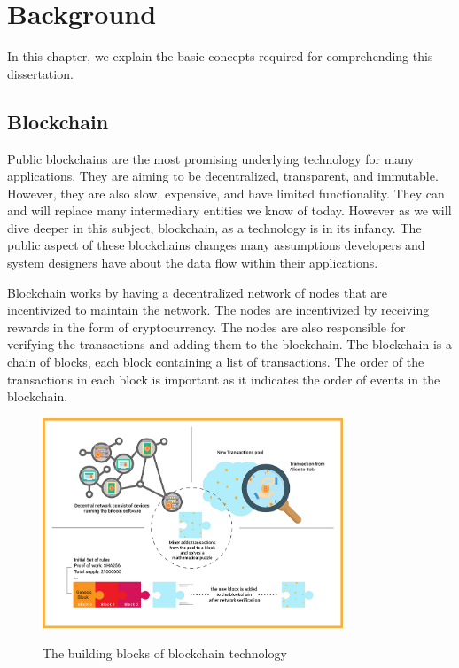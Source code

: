 


\chapter{Background} \label{sec:background}


In this chapter, we explain the basic concepts required for comprehending this dissertation.



\section{Blockchain}
Public blockchains are the most promising underlying technology for many applications. They are aiming to be decentralized, transparent, and immutable. However, they are also slow, expensive, and have limited functionality. They can and will replace many intermediary entities we know of today. However as we will dive deeper in this subject, blockchain, as a technology is in its infancy. The public aspect of these blockchains changes many assumptions developers and system designers have about the data flow within their applications. 

Blockchain works by having a decentralized network of nodes that are incentivized to maintain the network. The nodes are incentivized by receiving rewards in the form of cryptocurrency. The nodes are also responsible for verifying the transactions and adding them to the blockchain. The blockchain is a chain of blocks, each block containing a list of transactions. The order of the transactions in each block is important as it indicates the order of events in the blockchain.


\begin{figure}[h]
    \centering
    {\caption{The building blocks of blockchain technology~\cite{gaggioli2019middleman}}}
    {\includegraphics[width=0.8\textwidth]{figures/blockchain-buildingblocks.jpg}}
    \end{figure}


